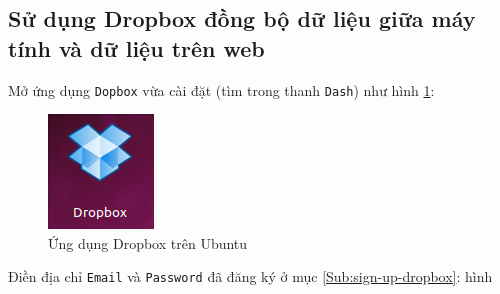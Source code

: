 \subsection{Sử dụng Dropbox đồng bộ dữ liệu giữa máy tính và dữ liệu trên web}
\begin{list}{--}{}
\item Mở ứng dụng \verb|Dopbox| vừa cài đặt (tìm trong thanh \verb|Dash|) như hình \ref{Fig:app-dropbox}:
\begin{figure}[!h]
\begin{center}
\includegraphics[scale=.5]{images/app-dropbox.png} 
\end{center}
\caption{Ứng dụng \textsf{Dropbox} trên \textsf{Ubuntu}} \label{Fig:app-dropbox}
\end{figure}
\item Điền địa chỉ \verb|Email| và \verb|Password| đã đăng ký ở mục \ref{Sub:sign-up-dropbox}: hình 
\begin{figure}[!h]
\begin{center}
 \hspace{.5cm}

\end{center}
\end{figure}
\end{list}
